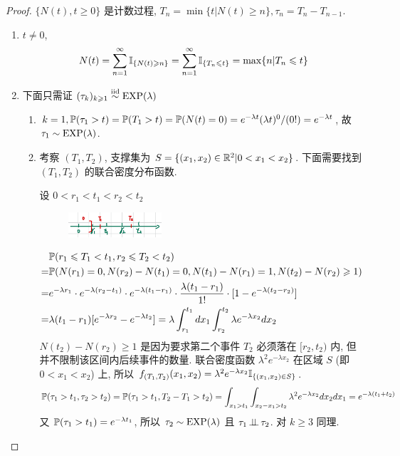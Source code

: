 \begin{proof}
$\{N(t),t\geq 0\}$ 是计数过程, $T_n=\min\{t|N(t)\geq n\}, \tau_n=T_n-T_{n-1}$.
\begin{enumerate}
    \item $t\neq 0$, 
    \[
    N(t)=\sum_{n=1}^{\infty}\mathbb I_{\{N(t)\geqslant n\}}=\sum_{n=1}^{\infty}\mathbb I_{\{T_n\leqslant t\}}=\max\{n|T_n\leqslant t\}
    \]
    \item 下面只需证 $(\tau_k)_{k\geqslant 1}\overset{\text{iid}}{\sim}\operatorname{EXP}(\lambda)$
    \begin{enumerate}
        \item $k=1, \mathbb{P}(\tau_1>t)=\mathbb{P}(T_1>t)=\mathbb{P}(N(t)=0)=e^{-\lambda t}(\lambda t)^0/(0!)=e^{-\lambda t}$, 故 $\tau_1\sim\operatorname{EXP}(\lambda)$.
        \item 考察 $(T_1,T_2)$, 支撑集为 $S=\{(x_1,x_2)\in \mathbb{R}^2|0<x_1<x_2\}$. 下面需要找到 $(T_1,T_2)$ 的联合密度分布函数. 
        
        设 $0<r_1<t_1<r_2<t_2$
        \begin{figure}[H]
            \centering
            \includegraphics[width=0.35\textwidth]{figures/note-p102.png}
        \end{figure}
        \[
        \begin{aligned}
            &\mathbb{P}(r_1\leqslant T_1<t_1,r_2\leqslant T_2<t_2) \\
            =&\mathbb{P}(N(r_1)=0,N(r_2)-N(t_1)=0,N(t_1)-N(r_1)=1,N(t_2)-N(r_2)\geqslant 1)\\
            =&e^{-\lambda r_1}\cdot e^{-\lambda (r_2-t_1)}\cdot e^{-\lambda (t_1-r_1)}\cdot \frac{\lambda (t_1-r_1)}{1!}\cdot [1-e^{-\lambda (t_2-r_2)}]\\
            =&\lambda (t_1-r_1)[e^{-\lambda r_2}-e^{-\lambda t_2}]=\lambda\int_{r_1}^{t_1}dx_1\int_{r_2}^{t_2}\lambda e^{-\lambda x_2}dx_2
        \end{aligned}
        \]
        $N(t_2)-N(r_2)\geq 1$ 是因为要求第二个事件 $T_2$ 必须落在 $[r_2,t_2)$ 内, 但并不限制该区间内后续事件的数量. 联合密度函数 $\lambda^2 e^{-\lambda x_2}$ 在区域 $S$ (即 $0<x_1<x_2$) 上, 所以 $f_{(T_1,T_2)}(x_1,x_2)=\lambda^2 e^{-\lambda x_2}\mathbb I_{\{(x_1,x_2)\in S\}}$.
        \[
        \mathbb{P}(\tau_1>t_1,\tau_2>t_2)=\mathbb{P}(\tau_1>t_1,T_2-T_1>t_2)=\int_{x_1>t_1}\int_{x_2-x_1>t_2}\lambda^2 e^{-\lambda x_2}dx_2 dx_1=e^{-\lambda (t_1+t_2)}
        \]
        又 $\mathbb{P}(\tau_1>t_1)=e^{-\lambda t_1}$, 所以 $\tau_2\sim \operatorname{EXP}(\lambda)$ 且 $\tau_1\operatorname{\perp\!\!\!\perp} \tau_2$. 对 $k\geq 3$ 同理.
    \end{enumerate}
\end{enumerate}
\end{proof}


